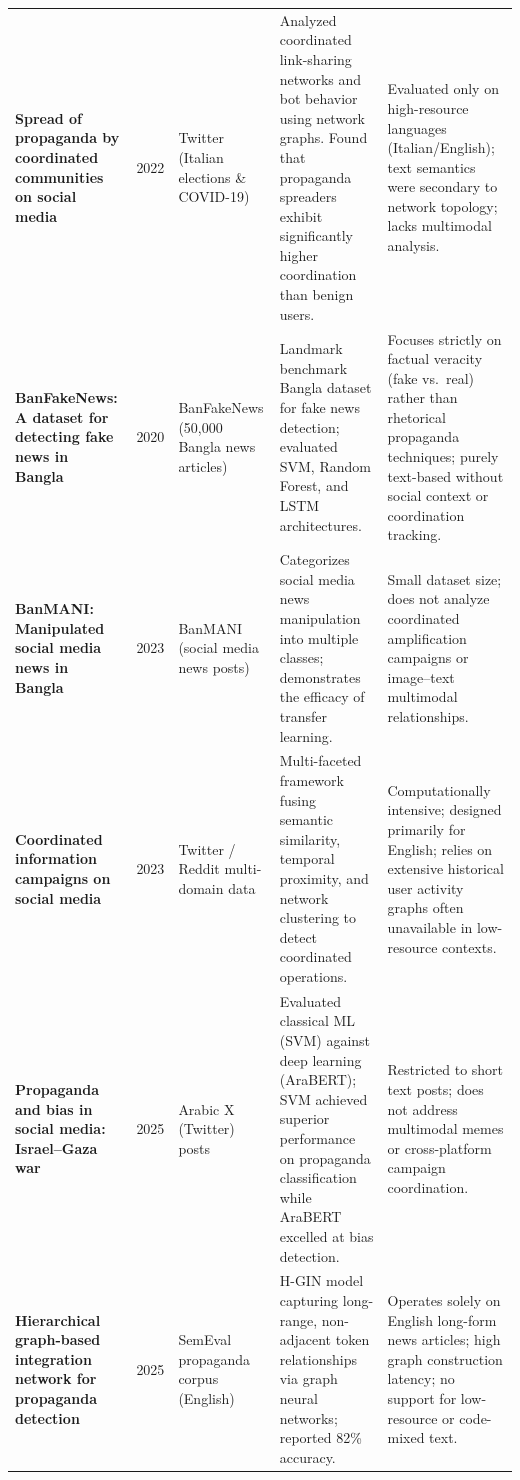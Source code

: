 \documentclass[12pt,a4paper]{report}
\begin{document}
\begin{longtable}{@{}L{3.1cm}C{0.8cm}L{2.2cm}L{3.5cm}L{3.3cm}@{}}
\textbf{Spread of propaganda by coordinated communities on social media}~\cite{hristakieva2022} & 2022 & Twitter (Italian elections \& COVID-19) &
Analyzed coordinated link-sharing networks and bot behavior using network graphs. Found that propaganda spreaders exhibit significantly higher coordination than benign users. &
Evaluated only on high-resource languages (Italian/English); text semantics were secondary to network topology; lacks multimodal analysis.\\
\addlinespace
\textbf{BanFakeNews: A dataset for detecting fake news in Bangla}~\cite{hossain2020} & 2020 & BanFakeNews (50,000 Bangla news articles) &
Landmark benchmark Bangla dataset for fake news detection; evaluated SVM, Random Forest, and LSTM architectures. &
Focuses strictly on factual veracity (fake vs.\ real) rather than rhetorical propaganda techniques; purely text-based without social context or coordination tracking.\\
\addlinespace
\textbf{BanMANI: Manipulated social media news in Bangla}~\cite{kamruzzaman2023} & 2023 & BanMANI (social media news posts) &
Categorizes social media news manipulation into multiple classes; demonstrates the efficacy of transfer learning. &
Small dataset size; does not analyze coordinated amplification campaigns or image--text multimodal relationships.\\
\addlinespace
\textbf{Coordinated information campaigns on social media}~\cite{ng2023} & 2023 & Twitter / Reddit multi-domain data &
Multi-faceted framework fusing semantic similarity, temporal proximity, and network clustering to detect coordinated operations. &
Computationally intensive; designed primarily for English; relies on extensive historical user activity graphs often unavailable in low-resource contexts.\\
\addlinespace
\textbf{Propaganda and bias in social media: Israel--Gaza war}~\cite{duridi2025} & 2025 & Arabic X (Twitter) posts &
Evaluated classical ML (SVM) against deep learning (AraBERT); SVM achieved superior performance on propaganda classification while AraBERT excelled at bias detection. &
Restricted to short text posts; does not address multimodal memes or cross-platform campaign coordination.\\
\addlinespace
\textbf{Hierarchical graph-based integration network for propaganda detection}~\cite{ahmad2025} & 2025 & SemEval propaganda corpus (English) &
H-GIN model capturing long-range, non-adjacent token relationships via graph neural networks; reported 82\% accuracy. &
Operates solely on English long-form news articles; high graph construction latency; no support for low-resource or code-mixed text.\\

\end{longtable}
\end{document}
